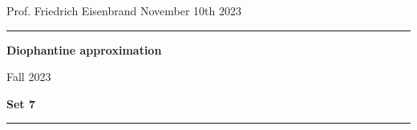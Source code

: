 \documentclass[12pt,a4paper]{article}
\date{}
\theoremstyle{plain}
\newtheorem*{Sol*}{Solution}
\theoremstyle{definition}
\newtheorem{Ex}{Exercise}
\newif\ifsolutions
\newcommand{\exercise}[2]{
			\begin{Ex} #1 \end{Ex}
			\ifsolutions  \begin{Sol*} #2 \end{Sol*} \bigskip \else \bigskip  \fi
		}
\begin{document}
\begin{center}
{Prof. Friedrich Eisenbrand \hfill November 10th 2023}
\end{center}
	
\hrule\vspace{\baselineskip}

\begin{center}
\textbf{Diophantine approximation}

Fall 2023

\bigskip

\textbf{Set 7}
\ifsolutions{\textbf{- Solutions}} \else{} \fi
\end{center}

\hrule\vspace{\baselineskip}



\end{document}
